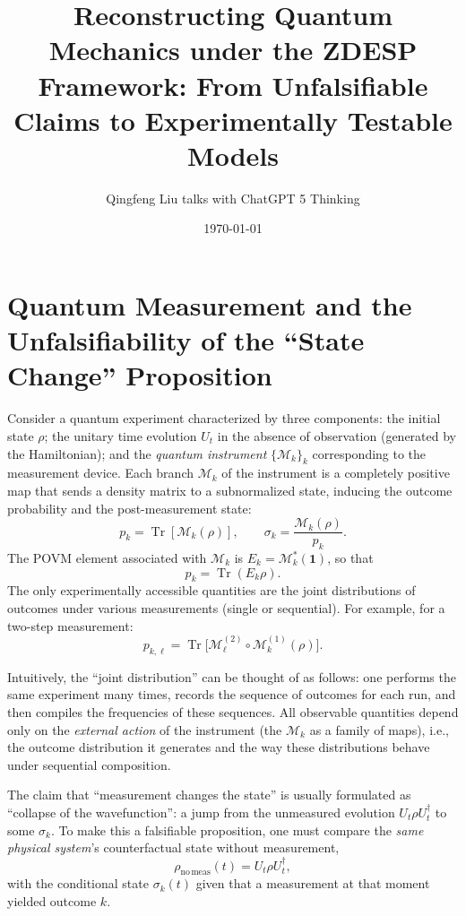 \documentclass[12pt,a4paper]{article}
\begin{document}
	
	\title{Reconstructing Quantum Mechanics under the ZDESP Framework: From Unfalsifiable Claims to Experimentally Testable Models\textsuperscript{\scriptsize\textcopyright}}
	\author{Qingfeng Liu talks with ChatGPT\textsuperscript{\scriptsize\textregistered} 5 Thinking}

	\date{\today}
	\maketitle
	
	\section{Quantum Measurement and the Unfalsifiability of the ``State Change'' Proposition}
	
	Consider a quantum experiment characterized by three components: the initial state $\rho$; the unitary time evolution $U_t$ in the absence of observation (generated by the Hamiltonian); and the \emph{quantum instrument} $\{\mathcal M_k\}_k$ corresponding to the measurement device. Each branch $\mathcal M_k$ of the instrument is a completely positive map that sends a density matrix to a subnormalized state, inducing the outcome probability and the post-measurement state:
	\[
	p_k = \operatorname{Tr}[\mathcal M_k(\rho)], \qquad
	\sigma_k = \frac{\mathcal M_k(\rho)}{p_k}.
	\]
	The POVM element associated with $\mathcal M_k$ is $E_k = \mathcal M_k^{\ast}(\mathbf 1)$, so that
	\[
	p_k = \operatorname{Tr}(E_k \rho).
	\]
	The only experimentally accessible quantities are the joint distributions of outcomes under various measurements (single or sequential). For example, for a two-step measurement:
	\[
	p_{k,\ell} = \operatorname{Tr}\!\big[ \mathcal M_\ell^{(2)} \circ \mathcal M_k^{(1)} (\rho) \big].
	\]
	
	Intuitively, the ``joint distribution'' can be thought of as follows: one performs the same experiment many times, records the sequence of outcomes for each run, and then compiles the frequencies of these sequences. All observable quantities depend only on the \emph{external action} of the instrument (the $\mathcal M_k$ as a family of maps), i.e., the outcome distribution it generates and the way these distributions behave under sequential composition.
	
	The claim that ``measurement changes the state'' is usually formulated as ``collapse of the wavefunction'': a jump from the unmeasured evolution $U_t \rho U_t^\dagger$ to some $\sigma_k$. To make this a falsifiable proposition, one must compare the \emph{same physical system}'s counterfactual state without measurement,
	\[
	\rho_{\mathrm{no\,meas}}(t) = U_t \rho U_t^\dagger,
	\]
	with the conditional state $\sigma_k(t)$ given that a measurement at that moment yielded outcome $k$.
	
\end{document}
